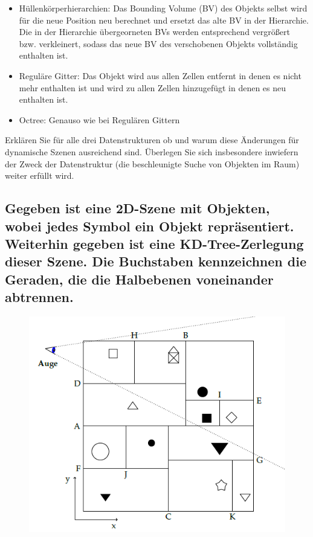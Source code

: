 \documentclass[a4paper,10pt,DIV=14]{scrartcl}
\begin{document}
\begin{itemize}
	\item Hüllenkörperhierarchien: Das Bounding Volume (BV) des Objekts selbst wird für die neue Position neu berechnet und ersetzt das alte BV in der Hierarchie. Die in der Hierarchie übergeorneten BVs werden entsprechend vergrößert bzw. verkleinert, sodass das neue BV des verschobenen Objekts vollständig enthalten ist.
	\item Reguläre Gitter: Das Objekt wird aus allen Zellen entfernt in denen es nicht mehr enthalten ist und wird zu allen Zellen hinzugefügt in denen es neu enthalten ist.
	\item Octree: Genauso wie bei Regulären Gittern
\end{itemize}

Erklären Sie für alle drei Datenstrukturen ob und warum diese Änderungen für dynamische Szenen ausreichend sind. Überlegen Sie sich insbesondere inwiefern der Zweck der Datenstruktur (die beschleunigte Suche von Objekten im Raum) weiter erfüllt wird.

\subsection{Gegeben ist eine 2D-Szene mit Objekten, wobei jedes Symbol ein Objekt repräsentiert. Weiterhin gegeben ist eine KD-Tree-Zerlegung dieser Szene. Die Buchstaben kennzeichnen die Geraden, die die Halbebenen voneinander abtrennen.}

\begin{figure}[!htbp]
	\centering
	\includegraphics[]{scene}
\end{figure}
\end{document}
